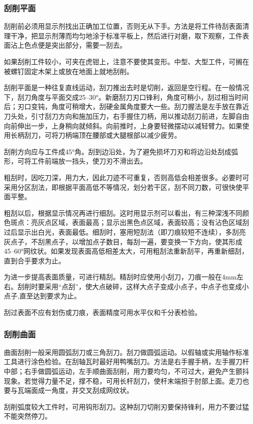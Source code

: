 \documentclass{ctexbook}
\begin{document}
\subsubsection{刮削平面}
刮削前必须用显示剂找出正确加工位置，否则无从下手。方法是将工件待刮表面清理干净，把显示剂薄而均匀地涂于标准平板上，然后进行对磨，取下观察，工件表面沾上色点便是突出部分，需要一刮去。

如果刮削工件较小，可夹在虎钳上，注意不要使其变形。中型、大型工件，可搁在被螺钉固定木架上或放在地面上就地刮削。

刮削平面是一种往复直线运动，刮刀推出去时是切削，返回是空行程。在一般情况下，刮刀角度与平面交成25--30°。新磨刮刀刃口锋利，角度可稍小，刮过相当时间后；刃口变钝，角度可稍增大，刮硬金属角度要大一些。刮刀握法是左手放在靠近刀头处，引寸刮刀方向和施加压力，右手握住刀柄，用以推动刮刀前进，左脚自由向前伸出一步，上身稍向就倾斜。向前推时，上身要轻微摆动以减轻臂力。如果使用长柄刮刀，可将刀柄端顶在腰部或大腿根部以减少疲劳。

刮削方向应与工件成45°角。刮到边沿处，为了避免损坏刀刃和将边沿处刮成弧形，可将工件前端放一挡头，使刀刃不滑出去。

粗刮时，因吃刀深，用力大，因此刀迹不可重复，否则高低会相差很多。必要时可采用分区刮法，即根据平面高低不等情况，划分若干区，刮不同刀数，可很快使平面平整。

粗刮以后，根据显示情况再进行细刮。这时用显示剂可以看出，有三种深浅不同颜色斑点：亮灰点区域，表面最高；显示出黑色点区域，表面较高；没有沾色区域刮过后显示出白光，表面最低。细刮时，塞用短刮法（即刀痕较短不连续），多刮亮灰点子，不刮黑点子，以增加点子数目，每刮一遍，要变换一下方向，使其形成45--60°网纹状。如果发现表面高低相差太大，可用粗刮法重新刮平，再重新细刮，直到合乎要求为止。

为进一步提高表面质量，可进行精刮。精刮时应使用小刮刀，刀痕一般在4mm左右。刮削时要采用“点刮”，使大点破碎，这样大点子变成小点子，中点子也变成小点子,直至达到要求为止。

刮过表面不应有划伤或刀痕，表面精度可用水平仪和千分表检验。
\subsubsection{刮削曲面}
曲面刮削一般采用圆弧刮刀或三角刮刀。刮刀做圆弧运动。以假轴或实用轴作标准工具进行涂色检验。在刮轴瓦时最好用鸭嘴刮刀。方法是右手握手柄，左手握刀杆中部；右手做圆弧运动，左手顺曲面刮削，用力要均匀，不可过大，避免产生颤抖现象。若觉得力量不足，撑不稳，可用长杆刮刀，使杆末端担于肘部上面。走刀也要与瓦端面成一角度，并交叉刮成网纹状。

刮削弧度较大工件时，可用钩形刮刀。这种刮刀切削刃要保持锋利，用力不要过猛不能突然停刀。
\end{document}
